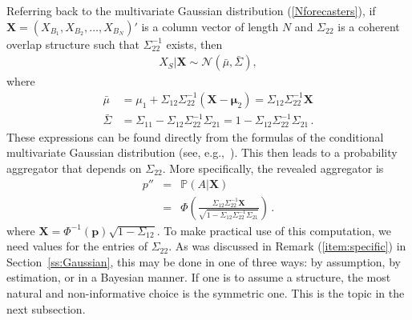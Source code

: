 \documentclass[11pt]{article}
\renewcommand{\P}{\mathbb{P}}
\theoremstyle{definition}
\theoremstyle{definition}
\def\one{{\bf 1}}
\def\P{{\mathbb P}}
\def\probit{p_{\rm probit}}
\begin{document}
Referring back to the multivariate Gaussian distribution
(\ref{Nforecasters}), if $\boldsymbol{X} = (X_{B_1}, X_{B_2}, \dots,
X_{B_N})'$ is a column vector of length $N$ and $\Sigma_{22}$ is a
coherent overlap structure such that $\Sigma_{22}^{-1}$ exists, then
\begin{align*}
X_{S} | \boldsymbol{X} \sim \mathcal{N}\left(\bar{\mu}, \bar{\Sigma}\right), 
\end{align*}
where
\begin{align*}
\bar{\mu} &= \mu_1 + \Sigma_{12} \Sigma_{22}^{-1} 
  (\boldsymbol{X} - \boldsymbol{\mu}_2) 
  = \Sigma_{12} \Sigma_{22}^{-1} \boldsymbol{X} \\
 \bar{\Sigma}&= \Sigma_{11} - \Sigma_{12} \Sigma_{22}^{-1} \Sigma_{21} 
 = 1 - \Sigma_{12} \Sigma_{22}^{-1} \Sigma_{21}   \, .
\end{align*}
These expressions can be found directly from the formulas of
the conditional multivariate Gaussian distribution (see, 
e.g.,~\citealt[Result~5.2.10, page~156]{ravishanker2001first}). 
This then leads to a probability aggregator that depends on 
$\Sigma_{22}$.  More specifically, the revealed aggregator is
\begin{eqnarray}
p'' & = & \P\left(A  | \boldsymbol{X}\right)  \nonumber \\
&=& \Phi\left( \frac{\Sigma_{12} \Sigma_{22}^{-1} \boldsymbol{X}}
   {\sqrt{1 - \Sigma_{12} \Sigma_{22}^{-1} \Sigma_{21}}}\right) 
\label{GeneralAggregator} \, .
\end{eqnarray}
 where $\boldsymbol{X} =
\Phi^{-1}(\boldsymbol{p})\sqrt{1-\Sigma_{12}}$. To make practical use
of this computation, we need values for the entries of $\Sigma_{22}$.
As  was discussed in Remark (\ref{item:specific}) in
Section~\ref{ss:Gaussian}, this may be done in one of three ways: by
assumption, by estimation, or in a Bayesian manner. If one is to
assume a structure, the most natural and non-informative choice is the
symmetric one. This is the topic in the next subsection.
\end{document}
